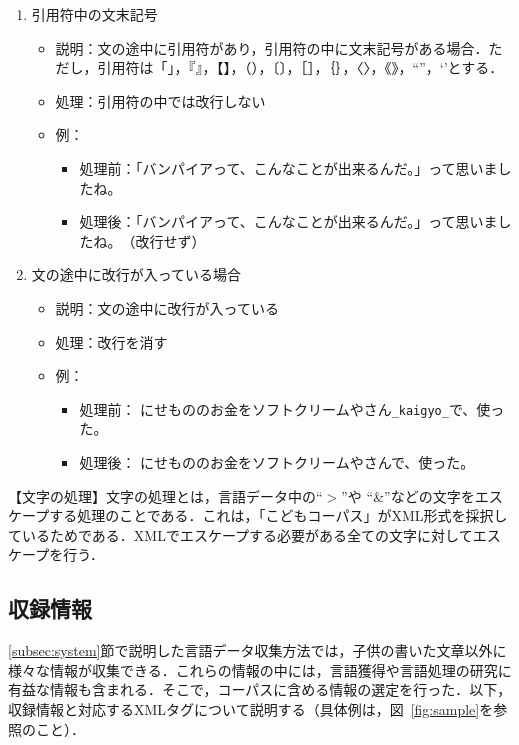 \documentclass[japanese]{jnlp_1.4}
\begin{document}
\begin{enumerate}
\item 引用符中の文末記号\label{subsubsec:3-2-1}
\begin{itemize}
 \item[]
説明：文の途中に引用符があり，引用符の中に文末記号がある場合．ただし，引用符は「」，『』，【】，（），〔〕，［］，｛｝，〈〉，《》，“”，‘’とする．
 
	\item[] 
	処理：引用符の中では改行しない
	\item[]
	例：
	 \begin{itemize}
	  \item[] 
		  処理前：「バンパイアって、こんなことが出来るんだ。」って思いましたね。
	  \item[] 
		  処理後：「バンパイアって、こんなことが出来るんだ。」って思いましたね。　（改行せず）
	 \end{itemize}
\end{itemize}
	 
\item 文の途中に改行が入っている場合\label{subsubsec:3-1-1}
  \begin{itemize}
  \item[]
  説明：文の途中に改行が入っている
  \item[]
  処理：改行を消す
  \item[] 
	例：
	\begin{itemize}
	 \item[]
		処理前：
		にせもののお金をソフトクリームやさん{\tt \_kaigyo\_}で、使った。
	 \item[] 
		処理後：
		にせもののお金をソフトクリームやさんで、使った。
	\end{itemize}
  \end{itemize}
\end{enumerate}


  【文字の処理】文字の処理とは，言語データ中の``$>$''や ``\&''などの文字をエスケープする処理のことである．これは，「こどもコーパス」がXML形式を採択しているためである．XMLでエスケープする必要がある全ての文字に対してエスケープを行う．



\subsection{収録情報}\label{sec:corpus_information}

  \ref{subsec:system}節で説明した言語データ収集方法では，子供の書いた文章以外に様々な情報が収集できる．これらの情報の中には，言語獲得や言語処理の研究に有益な情報も含まれる．そこで，コーパスに含める情報の選定を行った．以下，収録情報と対応するXMLタグについて説明する（具体例は，図~\ref{fig:sample}を参照のこと）．
\end{document}
